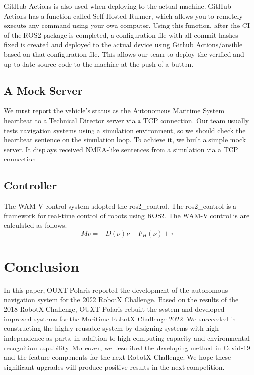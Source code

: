 \documentclass[lettersize,journal]{IEEEtran}
\begin{document}
GitHub Actions is also used when deploying to the actual machine.
GitHub Actions has a function called Self-Hosted Runner, which allows you to remotely execute any command using your own computer.
Using this function, after the CI of the ROS2 package is completed, 
a configuration file with all commit hashes fixed is created and deployed to the actual device
using Github Actions/ansible based on that configuration file.
This allows our team to deploy the verified and up-to-date source code to the machine at the push of a button.
\subsection{A Mock Server}
We must report the vehicle's status as the Autonomous Maritime System heartbeat to a Technical Director server via a TCP connection. 
Our team usually tests navigation systems using a simulation environment, 
so we should check the heartbeat sentence on the simulation loop. 
To achieve it, we built a simple mock server. 
It displays received NMEA-like sentences from a simulation via a TCP connection.

\subsection{Controller}
The WAM-V control system adopted the ros2\_control\cite{ros2_control,wamv_control}.
The ros2\_control is a framework for real-time control of robots using ROS2.
The WAM-V control is are calculated as follows.
\begin{equation}
  M \dot\nu = -D(\nu)\nu + F_H(\nu) + \tau
  \label{eq:control_1}
\end{equation}


\section{Conclusion}
In this paper, OUXT-Polaris reported the development of the autonomous navigation system for the 2022 RobotX Challenge.
Based on the results of the 2018 RobotX Challenge, OUXT-Polaris rebuilt the system and
developed improved systems for the Maritime RobotX Challenge 2022.
We succeeded in constructing the highly reusable system by designing systems with high independence as parts,
in addition to high computing capacity and environmental recognition capability.
Moreover, we described the developing method in Covid-19 and the feature components for the next RobotX Challenge.
We hope these significant upgrades will produce positive results in the next competition.
\end{document}
